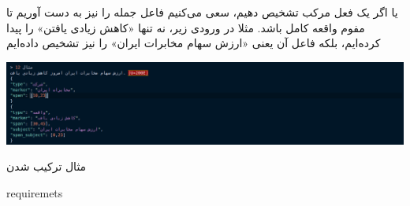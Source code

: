\documentclass[a4paper,12pt]{article}
\begin{document}
یا اگر یک فعل مرکب تشخیص دهیم، سعی می‌کنیم فاعل جمله‌ را نیز به دست آوریم تا مفوم 
واقعه کامل باشد. مثلا در ورودی زیر، نه تنها «کاهش زیادی یافتن» را پیدا کرده‌ایم، بلکه 
فاعل آن یعنی «ارزش سهام مخابرات 
ایران» را نیز تشخیص داده‌ایم 
\begin{center}
	\includegraphics[scale=0.5, trim ={0 0 17cm 0}, clip]{images/12.png}
\end{center}



مثال ترکیب شدن




requiremets
\end{document}
